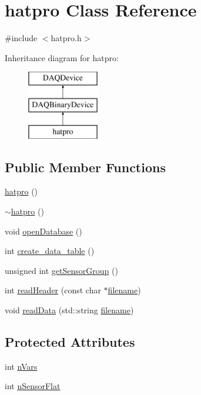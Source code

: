 \hypertarget{classhatpro}{\section{hatpro Class Reference}
\label{classhatpro}
}


{\ttfamily \#include $<$hatpro.\-h$>$}

Inheritance diagram for hatpro\-:\begin{figure}[H]
\begin{center}
\leavevmode
\includegraphics[height=3.000000cm]{classhatpro}
\end{center}
\end{figure}
\subsection*{Public Member Functions}
\begin{DoxyCompactItemize}
\item 
\hyperlink{classhatpro_aa708fafc960ee885b4545c2ebfd81780}{hatpro} ()
\item 
\hyperlink{classhatpro_abf2202318c5b00a9a8e1140e2971f112}{$\sim$hatpro} ()
\item 
void \hyperlink{classhatpro_a8d4126b59d1f8c9958b533ff1022f90a}{open\-Database} ()
\item 
int \hyperlink{classhatpro_aa252764179bbe6f3c06b4a02ded7be52}{create\-\_\-data\-\_\-table} ()
\item 
unsigned int \hyperlink{classhatpro_a0bfedca307a0c586e4eaf3ff60ef64a3}{get\-Sensor\-Group} ()
\item 
int \hyperlink{classhatpro_a5122a613dc3fc746347cf221648af619}{read\-Header} (const char $\ast$\hyperlink{classDAQDevice_a7f9cda7cf5b41f6b134c313477e9644b}{filename})
\item 
void \hyperlink{classhatpro_a6a22e73eb5d50f6425d8e46795d2007a}{read\-Data} (std\-::string \hyperlink{classDAQDevice_a7f9cda7cf5b41f6b134c313477e9644b}{filename})
\end{DoxyCompactItemize}
\subsection*{Protected Attributes}
\begin{DoxyCompactItemize}
\item 
int \hyperlink{classhatpro_a6de7c54e88b099087eec558a97b24e64}{n\-Vars}
\item 
int \hyperlink{classhatpro_a59197a83629dd383c55b4d3332ae70d8}{n\-Sensor\-Flat}
\end{DoxyCompactItemize}
